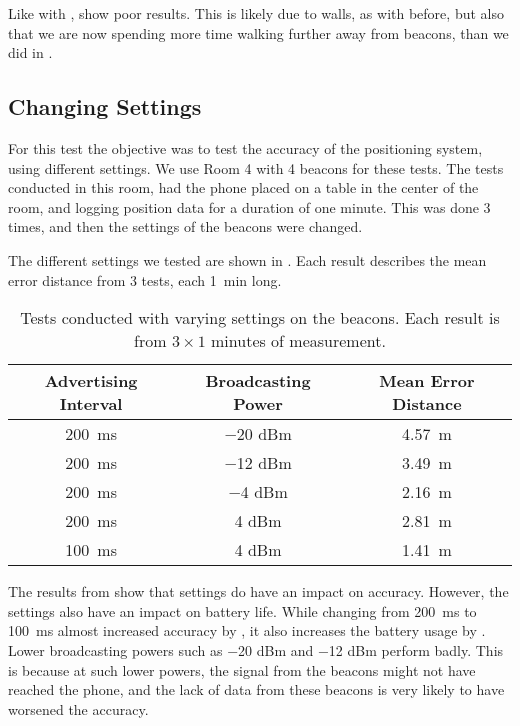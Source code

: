 Like with ,  show poor results. 
This is likely due to walls, as with before, 
but also that we are now spending more time walking further away from beacons, 
than we did in .

\subsection{Changing Settings}\label{sec:settings}
For this test the objective was to test the accuracy of the positioning system,
using different settings. 
We use Room 4 with \num{4} beacons for these tests. 
The tests conducted in this room, 
had the phone placed on a table in the center of the room, 
and logging position data for a duration of one minute.
This was done \num{3} times, 
and then the settings of the beacons were changed.

The different settings we tested are shown in .
Each result describes the mean error distance from \num{3} tests, 
each \SI{1}{\minute} long.  

\begin{table}[!htb]
  \centering
  \begin{tabular}{c|c|c}
    Advertising Interval    & Broadcasting Power & Mean Error Distance \\ \hline
    \SI{200}{\milli\second} & \num{-20} dBm      & \SI{4.57}{\meter} \\ 
    \SI{200}{\milli\second} & \num{-12} dBm      & \SI{3.49}{\meter} \\ 
    \SI{200}{\milli\second} & \num{-4} dBm       & \SI{2.16}{\meter} \\ 
    \SI{200}{\milli\second} & \num{4} dBm        & \SI{2.81}{\meter} \\ 
    \SI{100}{\milli\second} & \num{4} dBm        & \SI{1.41}{\meter} \\ 
  \end{tabular}
  \caption{Tests conducted with varying settings on the beacons. Each result is from $3 \times 1$ minutes of measurement.}
  \label{table:precisiontest:settings}
\end{table}

The results from  show that settings do have an impact on accuracy. 
However, the settings also have an impact on battery life. 
While changing from \SI{200}{\milli\second} to \SI{100}{\milli\second} almost increased accuracy by ,
it also increases the battery usage by .
Lower broadcasting powers such as \num{-20} dBm and \num{-12} dBm perform badly. 
This is because at such lower powers, 
the signal from the beacons might not have reached the phone, 
and the lack of data from these beacons is very likely to have worsened the accuracy.

